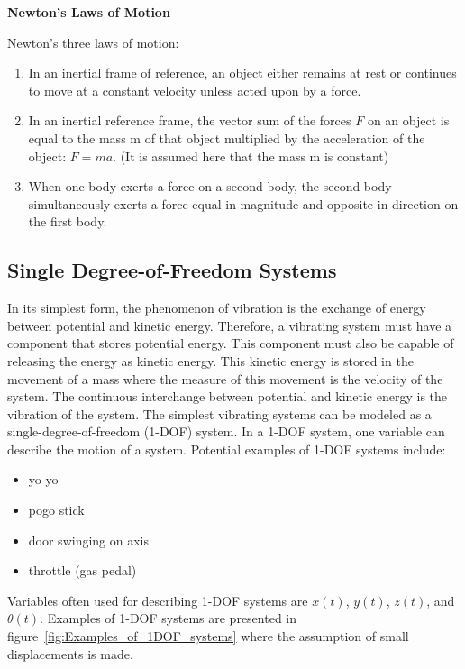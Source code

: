 \documentclass[12pt,letter]{article}
\begin{document}
	\begin{review}

		\textbf{Newton's Laws of Motion}

		\noindent Newton's three laws of motion:
		\begin{enumerate}
			\item In an inertial frame of reference, an object either remains at rest or continues to move at a constant velocity unless acted upon by a force.
			\item In an inertial reference frame, the vector sum of the forces $F$ on an object is equal to the mass m of that object multiplied by the acceleration of the object: $F = ma$. (It is assumed here that the mass m is constant)
			\item When one body exerts a force on a second body, the second body simultaneously exerts a force equal in magnitude and opposite in direction on the first body.
		\end{enumerate}
	\end{review}

	\subsection{Single Degree-of-Freedom Systems}
	
        In its simplest form, the phenomenon of vibration is the exchange of energy between potential and kinetic energy. Therefore, a vibrating system must have a component that stores potential energy. This component must also be capable of releasing the energy as kinetic energy. This kinetic energy is stored in the movement of a mass where the measure of this movement is the velocity of the system. The continuous interchange between potential and kinetic energy is the vibration of the system. The simplest vibrating systems can be modeled as a single-degree-of-freedom (1-DOF) system. In a 1-DOF system, one variable can describe the motion of a system. Potential examples of 1-DOF systems include:
		\begin{itemize}
			\item yo-yo
			\item pogo stick
			\item door swinging on axis
			\item throttle (gas pedal)
		\end{itemize}
				

		Variables often used for describing 1-DOF systems are $x(t)$,  $y(t)$,  $z(t)$, and  $\theta(t)$.  Examples of 1-DOF systems are presented in figure~\ref{fig:Examples_of_1DOF_systems} where the assumption of small displacements is made. 
\end{document}

